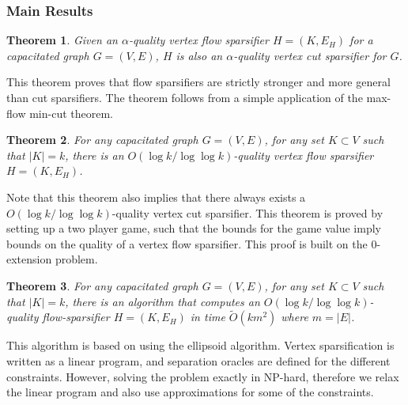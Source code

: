 \documentclass[12pt]{article}
\newtheorem{theorem}{Theorem}
\begin{document}
\subsubsection{Main Results}



		\begin{theorem}
        Given an $\alpha$-quality vertex flow sparsifier $H = (K, E_H)$ for a capacitated graph $G = (V,E)$, $H$ is also an $\alpha$-quality vertex cut sparsifier for $G$.
    \end{theorem}

		This theorem proves that flow sparsifiers are strictly stronger and more general than cut sparsifiers. The theorem follows from a simple application of the max-flow min-cut theorem.
    
    \begin{theorem}
        For any capacitated graph $G = (V,E)$, for any set $K \subset V$ such that $|K| = k$, there is an $O(\log k / \log \log k)$-quality vertex flow sparsifier $H = (K, E_H)$.
    \end{theorem}
    
    Note that this theorem also implies that there always exists a $O(\log k / \log \log k)$-quality vertex cut sparsifier. This theorem is proved by setting up a two player game, such that the bounds for the game value imply bounds on the quality of a vertex flow sparsifier. This proof is built on the 0-extension problem.
    
    
    \begin{theorem}
        For any capacitated graph $G = (V,E)$, for any set $K \subset V$ such that $|K| = k$, there is an algorithm that computes an $O(\log k / \log \log k)$-quality flow-sparsifier $H = (K, E_H)$ in time $\tilde{O}(km^2)$ where $m = |E|$.
    \end{theorem}

    This algorithm is based on using the ellipsoid algorithm. Vertex sparsification is written as a linear program, and separation oracles are defined for the different constraints. However, solving the problem exactly in NP-hard, therefore we relax the linear program and also use approximations for some of the constraints.
    
\end{document}
